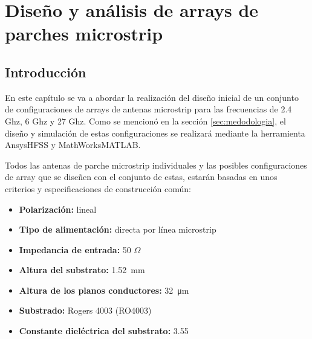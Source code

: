 
\chapter{Diseño y análisis de arrays de parches microstrip}
\label{diseño}

\section{Introducción}

\par En este capítulo se va a abordar la realización del diseño inicial de un conjunto de configuraciones de arrays de antenas microstrip para las frecuencias de 2.4 Ghz, 6 Ghz y 27 Ghz. Como se mencionó en la sección \ref{sec:medodologia}, el diseño y simulación de estas configuraciones se realizará mediante la herramienta Ansys\textregistered HFSS y MathWorks\textregistered  MATLAB.
\\
\par Todos las antenas de parche microstrip individuales y las posibles configuraciones de array que se diseñen con el conjunto de estas, estarán basadas en unos criterios y especificaciones de construcción común:

\begin{itemize}
	\item \textbf{Polarización: }lineal
	\item \textbf{Tipo de alimentación: } directa por línea microstrip
	\item \textbf{Impedancia de entrada: }50 $\Omega$
	\item \textbf{Altura del substrato: }\SI{1.52}{\milli\metre}
	\item \textbf{Altura de los planos conductores: }\SI{32}{\micro\metre}
	\item \textbf{Substrado: }Rogers 4003 (RO4003)
	\item \textbf{Constante dieléctrica del substrato: }3.55
\end{itemize}

